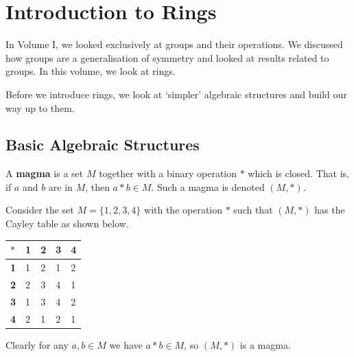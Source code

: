 \chapter{Introduction to Rings}
In Volume I, we looked exclusively at groups and their operations. We discussed how groups are a generalisation of symmetry and looked at results related to groups. In this volume, we look at rings.

Before we introduce rings, we look at `simpler' algebraic structures and build our way up to them.

\section{Basic Algebraic Structures}
\begin{definition}
    A \textbf{magma} is a set $M$ together with a binary operation $\ast$ which is closed. That is, if $a$ and $b$ are in $M$, then $a \ast b \in M$. Such a magma is denoted $(M, \ast)$.
\end{definition}
\begin{example}
    Consider the set $M = \{1, 2, 3, 4\}$ with the operation $\ast$ such that $(M, \ast)$ has the Cayley table as shown below.
    \begin{table}[h]
        \centering
        \begin{tabular}{|l|l|l|l|l|}
            \hline
            $\ast$     & \textbf{1} & \textbf{2} & \textbf{3} & \textbf{4} \\ \hline
            \textbf{1} & 1          & 2          & 1          & 2          \\ \hline
            \textbf{2} & 2          & 3          & 4          & 1          \\ \hline
            \textbf{3} & 1          & 3          & 4          & 2          \\ \hline
            \textbf{4} & 2          & 1          & 2          & 1          \\ \hline
        \end{tabular}
    \end{table}
    
    Clearly for any $a, b\in M$ we have $a \ast b \in M$, so $(M, \ast)$ is a magma.
\end{example}

